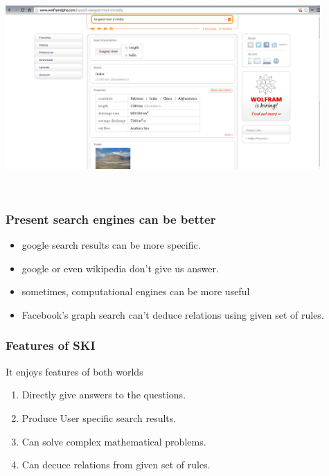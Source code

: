 \documentclass{beamer}
\begin{document}
\begin{frame}
 \includegraphics[width=12cm,height=8cm]{one.png}
\end{frame}


\begin{frame}
   \frametitle{Present search engines can be better}
 \begin{itemize}
  \item google search results can be more specific.
   \item google or even wikipedia don't give us answer.
  \item sometimes, computational engines can be more useful
 
  \pause
  \item Facebook's graph search can't deduce relations using given set of rules.
 \end{itemize}
\end{frame}

\begin{frame}
 \frametitle{Features of SKI}
 \begin{block}{It enjoys features of both worlds}
 \begin{enumerate}
  \item Directly give answers to the questions.
  \pause
  \item Produce User specific search results.
  \pause
  \item Can solve complex mathematical problems.
  \pause
  \item Can decuce relations from given set of rules.
 \end{enumerate}
 \end{block}
\end{frame}
\end{document}

